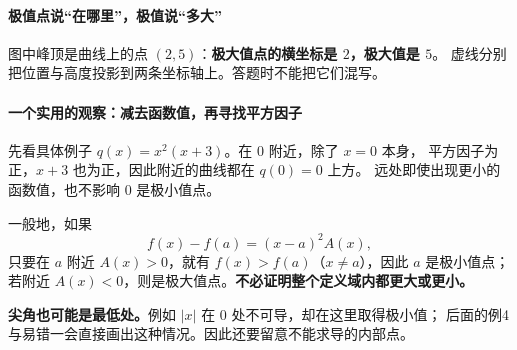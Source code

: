 \clearpage
\begin{explanationbox}
\paragraph{极值点说“在哪里”，极值说“多大”}

\begin{center}\end{center}

图中峰顶是曲线上的点 $(2,5)$：\textbf{极大值点的横坐标是 $2$，极大值是 $5$}。
虚线分别把位置与高度投影到两条坐标轴上。答题时不能把它们混写。
\end{explanationbox}
\clearpage
\begin{explanationbox}
\paragraph{一个实用的观察：减去函数值，再寻找平方因子}

\begin{center}\end{center}

先看具体例子 $q(x)=x^2(x+3)$。在 $0$ 附近，除了 $x=0$ 本身，
平方因子为正，$x+3$ 也为正，因此附近的曲线都在 $q(0)=0$ 上方。
远处即使出现更小的函数值，也不影响 $0$ 是极小值点。

一般地，如果
\[
f(x)-f(a)=(x-a)^2A(x),
\]
只要在 $a$ 附近 $A(x)>0$，就有 $f(x)>f(a)$（$x\ne a$），因此 $a$ 是极小值点；
若附近 $A(x)<0$，则是极大值点。\textbf{不必证明整个定义域内都更大或更小。}

\textbf{尖角也可能是最低处。}例如 $|x|$ 在 $0$ 处不可导，却在这里取得极小值；
后面的例4与易错一会直接画出这种情况。因此还要留意不能求导的内部点。
\end{explanationbox}
